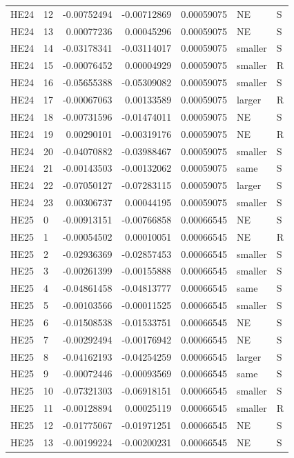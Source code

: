 \documentclass[11pt]{article}
\begin{document}
{\begin{longtable}{llrrrll}
HE24 & 12 & -0.00752494 & -0.00712869 & 0.00059075 & NE & S\\
HE24 & 13 & 0.00077236 & 0.00045296 & 0.00059075 & NE & S\\
HE24 & 14 & -0.03178341 & -0.03114017 & 0.00059075 & smaller & S\\
HE24 & 15 & -0.00076452 & 0.00004929 & 0.00059075 & smaller & R\\
HE24 & 16 & -0.05655388 & -0.05309082 & 0.00059075 & smaller & S\\
HE24 & 17 & -0.00067063 & 0.00133589 & 0.00059075 & larger & R\\
HE24 & 18 & -0.00731596 & -0.01474011 & 0.00059075 & NE & S\\
HE24 & 19 & 0.00290101 & -0.00319176 & 0.00059075 & NE & R\\
HE24 & 20 & -0.04070882 & -0.03988467 & 0.00059075 & smaller & S\\
HE24 & 21 & -0.00143503 & -0.00132062 & 0.00059075 & same & S\\
HE24 & 22 & -0.07050127 & -0.07283115 & 0.00059075 & larger & S\\
HE24 & 23 & 0.00306737 & 0.00044195 & 0.00059075 & smaller & S\\
HE25 & 0 & -0.00913151 & -0.00766858 & 0.00066545 & NE & S\\
HE25 & 1 & -0.00054502 & 0.00010051 & 0.00066545 & NE & R\\
HE25 & 2 & -0.02936369 & -0.02857453 & 0.00066545 & smaller & S\\
HE25 & 3 & -0.00261399 & -0.00155888 & 0.00066545 & smaller & S\\
HE25 & 4 & -0.04861458 & -0.04813777 & 0.00066545 & same & S\\
HE25 & 5 & -0.00103566 & -0.00011525 & 0.00066545 & smaller & S\\
HE25 & 6 & -0.01508538 & -0.01533751 & 0.00066545 & NE & S\\
HE25 & 7 & -0.00292494 & -0.00176942 & 0.00066545 & NE & S\\
HE25 & 8 & -0.04162193 & -0.04254259 & 0.00066545 & larger & S\\
HE25 & 9 & -0.00072446 & -0.00093569 & 0.00066545 & same & S\\
HE25 & 10 & -0.07321303 & -0.06918151 & 0.00066545 & smaller & S\\
HE25 & 11 & -0.00128894 & 0.00025119 & 0.00066545 & smaller & R\\
HE25 & 12 & -0.01775067 & -0.01971251 & 0.00066545 & NE & S\\
HE25 & 13 & -0.00199224 & -0.00200231 & 0.00066545 & NE & S\\

\end{longtable}}
\end{document}
